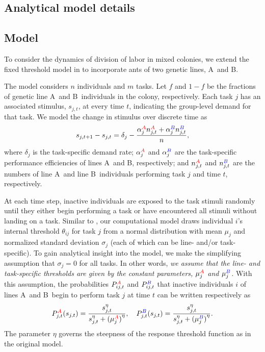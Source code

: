 \documentclass[11pt]{article}
\newcommand{\A}{{\color{red}A}}
\newcommand{\B}{{\color{blue}B}}
\begin{document}
\begin{appendices}

\section{Analytical model details} \label{sec:appendix}

\subsection{Model} \label{sec:model}

To consider the dynamics of division of labor in mixed colonies, we extend the fixed threshold model in \cite{ulrich18} to incorporate ants of two genetic lines, \A\ and \B. 

The model considers $n$ individuals and $m$ tasks. 
Let $f$ and $1-f$ be the fractions of genetic line \A\ and \B\ individuals in the colony, respectively.
Each task $j$ has an associated stimulus, $s_{j,t}$, at every time $t$, indicating the group-level demand for that task. We model the change in stimulus over discrete time as
\begin{equation}
    s_{j,t+1} - s_{j,t}  = \delta_j - \frac{\alpha_j^{\A} n_{j,t}^{\A} + \alpha_j^{\B} n_{j,t}^{\B} }{n}, \label{eq:stim}
\end{equation}
where $\delta_j$ is the task-specific demand rate; $\alpha_j^{\A}$ and $\alpha_j^{\B}$ are the task-specific performance efficiencies of lines \A\ and \B, respectively; and $n_{j,t}^{\A}$ and $n_{j,t}^{\B}$ are the numbers of line \A\ and line \B\ individuals performing task $j$ and time $t$, respectively.

At each time step, inactive individuals are exposed to the task stimuli randomly until they  either begin performing a task or have encountered all stimuli without landing on a task. Similar to \cite{ulrich18}, our computational model draws individual $i$'s internal threshold $\theta_{ij}$ for task $j$ from a normal distribution with mean $\mu_j$ and normalized standard deviation $\sigma_j$ (each of which can be line- and/or task-specific). To gain analytical insight into the model, we make the simplifying assumption that $\sigma_j = 0$ for all tasks.
In other words, \textit{we assume that the line- and task-specific thresholds are given by the constant parameters, $\mu_j^{\A}$ and $\mu_j^{\B}$.}
With this assumption, the probabilities $P_{ij,t}^{\A}$ and $P_{ij,t}^{\B}$ that inactive individuals $i$ of lines \A\ and \B\ begin to perform task $j$ at time $t$ can be written respectively as
\begin{equation}
    P_{j,t}^{\A} (s_{j,t}) = \frac{s_{j,t}^\eta}{s_{j,t}^\eta + {(\mu_j^{\A})}^\eta}, \quad P_{j,t}^{\B} (s_{j,t}) = \frac{s_{j,t}^\eta}{s_{j,t}^\eta +{(\mu_j^{\B})}^\eta}.
\end{equation}
The parameter $\eta$ governs the steepness of the response threshold function as in the original model.


\end{appendices}
\end{document}
